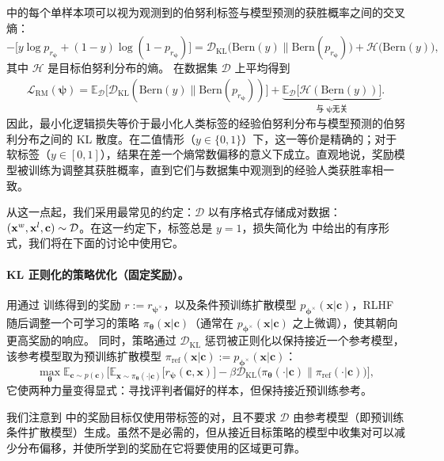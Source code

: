  中的每个单样本项可以视为观测到的伯努利标签与模型预测的获胜概率之间的交叉熵：
\[
-\big[y\log p_{r_{\bm\psi}}+(1-y)\log(1-p_{r_{\bm\psi}})\big]
= \mathcal D_{\mathrm{KL}} \big(\mathrm{Bern}(y) \big\| \mathrm{Bern}(p_{r_{\bm\psi}})\big)
+ \mathcal H \big(\mathrm{Bern}(y)\big),
\]
其中 $\mathcal H$ 是目标伯努利分布的熵。
在数据集 $\mathcal D$ 上平均得到
\begin{align}\label{eq:reward_loss}
    \mathcal L_{\mathrm{RM}}(\bm\psi)
= \mathbb E_{\mathcal D} \Big[\mathcal D_{\mathrm{KL}}\left(\mathrm{Bern}(y) \big\| \mathrm{Bern}(p_{r_{\bm\psi}})\right)\Big]
+ \underbrace{\mathbb E_{\mathcal D} \big[\mathcal H(\mathrm{Bern}(y))\big]}_{\text{与 }\bm\psi 无关}.
\end{align}
因此，最小化逻辑损失等价于最小化人类标签的经验伯努利分布与模型预测的伯努利分布之间的 KL 散度。在二值情形（$y\in\{0,1\}$）下，这一等价是精确的；对于软标签（$y\in[0,1]$），结果在差一个熵常数偏移的意义下成立。直观地说，奖励模型被训练为调整其获胜概率，直到它们与数据集中观测到的经验人类获胜率相一致。

从这一点起，我们采用最常见的约定：$\mathcal D$ 以有序格式存储成对数据：$({\mathbf{x}}^w, {\mathbf{x}}^l, {\mathbf{c}}) \sim \mathcal D$。在这一约定下，标签总是 $y=1$，损失简化为  中给出的有序形式，我们将在下面的讨论中使用它。

\paragraph{KL 正则化的策略优化（固定奖励）。}
用通过  训练得到的奖励 $r:=r_{\bm\psi^\times}$，以及条件预训练扩散模型 $p_{\bm{\phi}^\times}(\mathbf x|\mathbf c)$，RLHF 随后调整一个可学习的策略 $\pi_{\bm\theta}(\mathbf x|\mathbf c)$（通常在 $p_{\bm{\phi}^\times}(\mathbf x|\mathbf c)$ 之上微调），使其朝向更高奖励的响应。
同时，策略通过 $\mathcal{D}_{\mathrm{KL}}$ 惩罚被正则化以保持接近一个参考模型，该参考模型取为预训练扩散模型 $\pi_{\mathrm{ref}}(\mathbf x|\mathbf c):=p_{\bm{\phi}^\times}(\mathbf x|\mathbf c)$：
\begin{equation}\label{eq:rlhf-policy-correct}
\max_{\bm\theta}
\mathbb E_{\mathbf c\sim p(\mathbf c)}
\Big[
\mathbb E_{\mathbf x\sim \pi_{\bm\theta}(\cdot|\mathbf c)}\big[r_{\bm\psi}(\mathbf c,\mathbf x)\big]
-\beta \mathcal{D}_{\mathrm{KL}} \big(\pi_{\bm\theta}(\cdot|\mathbf c) \big\| \pi_{\mathrm{ref}}(\cdot|\mathbf c)\big)
\Big],
\end{equation}
它使两种力量变得显式：寻找评判者偏好的样本，但保持接近预训练参考。

我们注意到  中的奖励目标仅使用带标签的对，且不要求 $\mathcal D$ 由参考模型（即预训练条件扩散模型）生成。虽然不是必需的，但从接近目标策略的模型中收集对可以减少分布偏移，并使所学到的奖励在它将要使用的区域更可靠。

